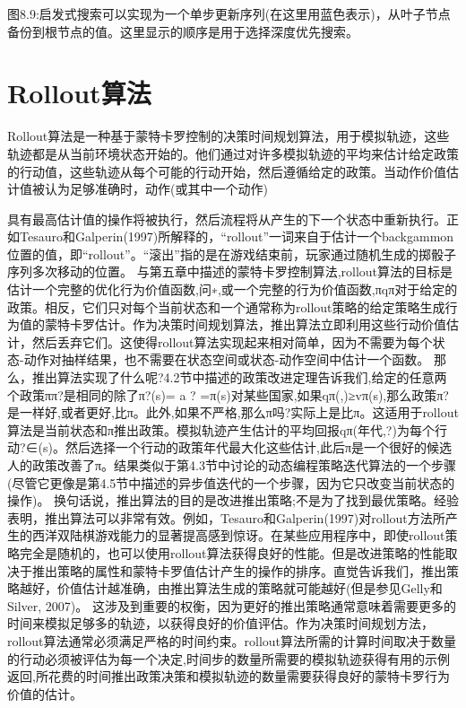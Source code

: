 图8.9:启发式搜索可以实现为一个单步更新序列(在这里用蓝色表示)，从叶子节点备份到根节点的值。这里显示的顺序是用于选择深度优先搜索。




\section{Rollout算法}

Rollout算法是一种基于蒙特卡罗控制的决策时间规划算法，用于模拟轨迹，这些轨迹都是从当前环境状态开始的。他们通过对许多模拟轨迹的平均来估计给定政策的行动值，这些轨迹从每个可能的行动开始，然后遵循给定的政策。当动作价值估计值被认为足够准确时，动作(或其中一个动作)

具有最高估计值的操作将被执行，然后流程将从产生的下一个状态中重新执行。正如Tesauro和Galperin(1997)所解释的，“rollout”一词来自于估计一个backgammon位置的值，即“rollout”。“滚出”指的是在游戏结束前，玩家通过随机生成的掷骰子序列多次移动的位置。
与第五章中描述的蒙特卡罗控制算法,rollout算法的目标是估计一个完整的优化行为价值函数,问∗,或一个完整的行为价值函数,πqπ对于给定的政策。相反，它们只对每个当前状态和一个通常称为rollout策略的给定策略生成行为值的蒙特卡罗估计。作为决策时间规划算法，推出算法立即利用这些行动价值估计，然后丢弃它们。这使得rollout算法实现起来相对简单，因为不需要为每个状态-动作对抽样结果，也不需要在状态空间或状态-动作空间中估计一个函数。
那么，推出算法实现了什么呢?4.2节中描述的政策改进定理告诉我们,给定的任意两个政策ππ?是相同的除了π?(s)= a ? =π(s)对某些国家,如果qπ(,)≥vπ(s),那么政策π?是一样好,或者更好,比π。此外,如果不严格,那么π吗?实际上是比π。这适用于rollout算法是当前状态和π推出政策。模拟轨迹产生估计的平均回报qπ(年代,?)为每个行动?∈(s)。然后选择一个行动的政策年代最大化这些估计,此后π是一个很好的候选人的政策改善了π。结果类似于第4.3节中讨论的动态编程策略迭代算法的一个步骤(尽管它更像是第4.5节中描述的异步值迭代的一个步骤，因为它只改变当前状态的操作)。
换句话说，推出算法的目的是改进推出策略;不是为了找到最优策略。经验表明，推出算法可以非常有效。例如，Tesauro和Galperin(1997)对rollout方法所产生的西洋双陆棋游戏能力的显著提高感到惊讶。在某些应用程序中，即使rollout策略完全是随机的，也可以使用rollout算法获得良好的性能。但是改进策略的性能取决于推出策略的属性和蒙特卡罗值估计产生的操作的排序。直觉告诉我们，推出策略越好，价值估计越准确，由推出算法生成的策略就可能越好(但是参见Gelly和Silver, 2007)。
这涉及到重要的权衡，因为更好的推出策略通常意味着需要更多的时间来模拟足够多的轨迹，以获得良好的价值评估。作为决策时间规划方法，rollout算法通常必须满足严格的时间约束。rollout算法所需的计算时间取决于数量的行动必须被评估为每一个决定,时间步的数量所需要的模拟轨迹获得有用的示例返回,所花费的时间推出政策决策和模拟轨迹的数量需要获得良好的蒙特卡罗行为价值的估计。

